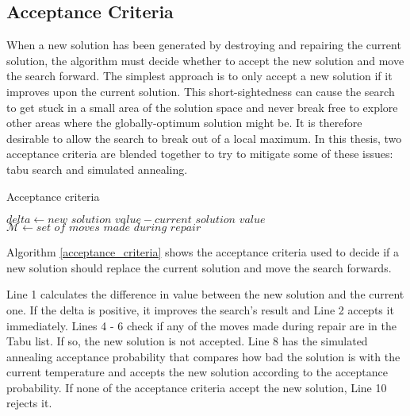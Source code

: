 \subsection{Acceptance Criteria} \label{acceptance}

When a new solution has been generated by destroying and repairing the current solution, the algorithm must decide whether to accept the new solution and move the search forward. The simplest approach is to only accept a new solution if it improves upon the current solution. This short-sightedness can cause the search to get stuck in a small area of the solution space and never break free to explore other areas where the globally-optimum solution might be. It is therefore desirable to allow the search to break out of a local maximum. In this thesis, two acceptance criteria are blended together to try to mitigate some of these issues: tabu search and simulated annealing.

\begin{algorithm}[H]
\caption{Acceptance criteria}\label{acceptance_criteria}
\begin{algorithmic}[1]
    \State $\textit{delta} \gets \textit{new solution value} - \textit{current solution value}$
    \State $\mathcal{M} \gets \textit{set of moves made during repair}$
    
    \EndIf
    
        \EndIf
    \EndFor
    
    \EndIf
    
    \State {}
\end{algorithmic}
\end{algorithm}

Algorithm \ref{acceptance_criteria} shows the acceptance criteria used to decide if a new solution should replace the current solution and move the search forwards.

Line 1 calculates the difference in value between the new solution and the current one. If the delta is positive, it improves the search's result and Line 2 accepts it immediately.
Lines 4 - 6 check if any of the moves made during repair are in the Tabu list. If so, the new solution is not accepted. Line 8 has the simulated annealing acceptance probability that compares how bad the solution is with the current temperature and accepts the new solution according to the acceptance probability. If none of the acceptance criteria accept the new solution, Line 10 rejects it.

